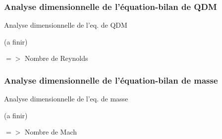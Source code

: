 \subsubsection{Analyse dimensionnelle de l'équation-bilan de QDM}

\begin{frame}{Analyse dimensionnelle de l'eq. de QDM} 

(a finir) 

$=>$ Nombre de Reynolds

\end{frame}


\subsubsection{Analyse dimensionnelle de l'équation-bilan de masse }

\begin{frame}{Analyse dimensionnelle de l'eq. de masse} 

(a finir) 

$=>$ Nombre de Mach

\end{frame}



%
%
%
%
%
%
%
%
%



